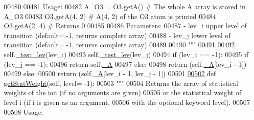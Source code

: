 \begin{DoxyCode}
{{00480 \textcolor{stringliteral}{            }
00481 \textcolor{stringliteral}{        Usage:}
00482 \textcolor{stringliteral}{            A\_O3 = O3.getA()          # The whole A array is stored in A\_O3}
00483 \textcolor{stringliteral}{            O3.getA(4, 2)      # A(4, 2) of the O3 atom is printed}
00484 \textcolor{stringliteral}{            O3.getA(2, 4)      # Returns 0}
00485 \textcolor{stringliteral}{}
00486 \textcolor{stringliteral}{        Parameters:}
00487 \textcolor{stringliteral}{            - lev\_i  upper level of transition (default= -1, returns complete array)}
00488 \textcolor{stringliteral}{            - lev\_j  lower level of transition (default= -1, returns complete array)}
00489 \textcolor{stringliteral}{            }
00490 \textcolor{stringliteral}{        """}
00491         
00492         self.\hyperlink{classpyneb_1_1core_1_1pynebcore_1_1___atom_data_ascii_a2b36467278900c759761366fe5b69c37}{\_test\_lev}(lev\_i)
00493         self.\hyperlink{classpyneb_1_1core_1_1pynebcore_1_1___atom_data_ascii_a2b36467278900c759761366fe5b69c37}{\_test\_lev}(lev\_j)
00494         \textcolor{keywordflow}{if} (lev\_i == -1):
00495             \textcolor{keywordflow}{if} (lev\_j == -1):
00496                 \textcolor{keywordflow}{return} self.\hyperlink{classpyneb_1_1core_1_1pynebcore_1_1___atom_data_ascii_ae3bb56f0dd8397279d1e394768404903}{\_A}
00497             \textcolor{keywordflow}{else}:
00498                 \textcolor{keywordflow}{return} (self.\hyperlink{classpyneb_1_1core_1_1pynebcore_1_1___atom_data_ascii_ae3bb56f0dd8397279d1e394768404903}{\_A}[lev\_i - 1])
00499         \textcolor{keywordflow}{else}:
00500             \textcolor{keywordflow}{return} (self.\hyperlink{classpyneb_1_1core_1_1pynebcore_1_1___atom_data_ascii_ae3bb56f0dd8397279d1e394768404903}{\_A}[lev\_i - 1, lev\_j - 1])       
00501     
\hypertarget{pynebcore_8py_source_l00502}{}\hyperlink{classpyneb_1_1core_1_1pynebcore_1_1___atom_data_ascii_a0b913fd7ff9b235a699c735b33c96e85}{00502}     \textcolor{keyword}{def }\hyperlink{classpyneb_1_1core_1_1pynebcore_1_1___atom_data_ascii_a0b913fd7ff9b235a699c735b33c96e85}{getStatWeight}(self, level= -1):
00503         \textcolor{stringliteral}{"""}
00504 \textcolor{stringliteral}{        Returns the array of statistical weights of the ion (if no arguments are given) }
00505 \textcolor{stringliteral}{            or the statistical weight of level i (if i is given as an argument, }
00506 \textcolor{stringliteral}{            with the optional keyword level).}
00507 \textcolor{stringliteral}{            }
00508 \textcolor{stringliteral}{        Usage:}
}}
\end{DoxyCode}
